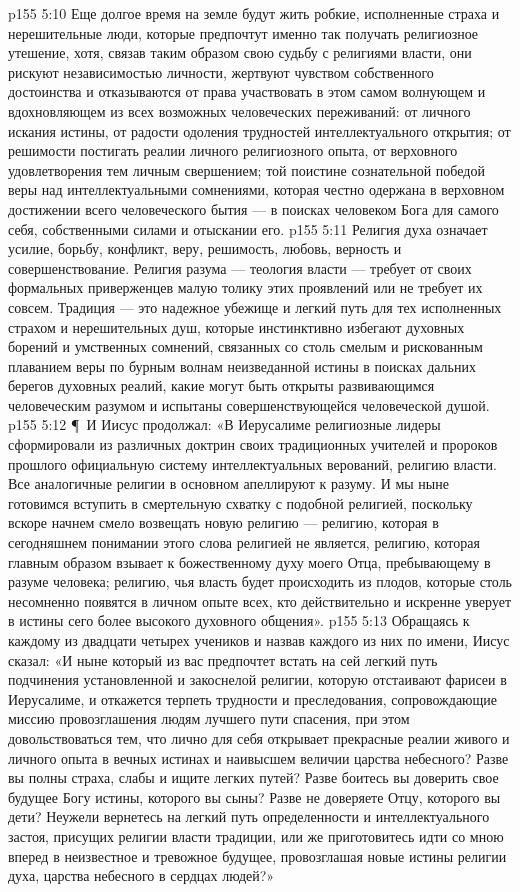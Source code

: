 \vs p155 5:10 Еще долгое время на земле будут жить робкие, исполненные страха и нерешительные люди, которые предпочтут именно так получать религиозное утешение, хотя, связав таким образом свою судьбу с религиями власти, они рискуют независимостью личности, жертвуют чувством собственного достоинства и отказываются от права участвовать в этом самом волнующем и вдохновляющем из всех возможных человеческих переживаний: от личного искания истины, от радости одоления трудностей интеллектуального открытия; от решимости постигать реалии личного религиозного опыта, от верховного удовлетворения тем личным свершением; той поистине сознательной победой веры над интеллектуальными сомнениями, которая честно одержана в верховном достижении всего человеческого бытия --- в поисках человеком Бога для самого себя, собственными силами и отыскании его.
\vs p155 5:11 Религия духа означает усилие, борьбу, конфликт, веру, решимость, любовь, верность и совершенствование. Религия разума --- теология власти --- требует от своих формальных приверженцев малую толику этих проявлений или не требует их совсем. Традиция --- это надежное убежище и легкий путь для тех исполненных страхом и нерешительных душ, которые инстинктивно избегают духовных борений и умственных сомнений, связанных со столь смелым и рискованным плаванием веры по бурным волнам неизведанной истины в поисках дальних берегов духовных реалий, какие могут быть открыты развивающимся человеческим разумом и испытаны совершенствующейся человеческой душой.
\vs p155 5:12 \P\ И Иисус продолжал: «В Иерусалиме религиозные лидеры сформировали из различных доктрин своих традиционных учителей и пророков прошлого официальную систему интеллектуальных верований, религию власти. Все аналогичные религии в основном апеллируют к разуму. И мы ныне готовимся вступить в смертельную схватку с подобной религией, поскольку вскоре начнем смело возвещать новую религию --- религию, которая в сегодняшнем понимании этого слова религией не является, религию, которая главным образом взывает к божественному духу моего Отца, пребывающему в разуме человека; религию, чья власть будет происходить из плодов, которые столь несомненно появятся в личном опыте всех, кто действительно и искренне уверует в истины сего более высокого духовного общения».
\vs p155 5:13 Обращаясь к каждому из двадцати четырех учеников и назвав каждого из них по имени, Иисус сказал: «И ныне который из вас предпочтет встать на сей легкий путь подчинения установленной и закоснелой религии, которую отстаивают фарисеи в Иерусалиме, и откажется терпеть трудности и преследования, сопровождающие миссию провозглашения людям лучшего пути спасения, при этом довольствоваться тем, что лично для себя открывает прекрасные реалии живого и личного опыта в вечных истинах и наивысшем величии царства небесного? Разве вы полны страха, слабы и ищите легких путей? Разве боитесь вы доверить свое будущее Богу истины, которого вы сыны? Разве не доверяете Отцу, которого вы дети? Неужели вернетесь на легкий путь определенности и интеллектуального застоя, присущих религии власти традиции, или же приготовитесь идти со мною вперед в неизвестное и тревожное будущее, провозглашая новые истины религии духа, царства небесного в сердцах людей?»
